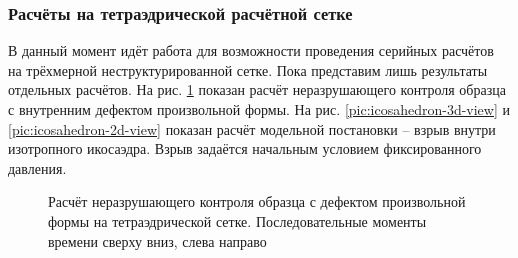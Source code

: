 \subsubsection{Расчёты на тетраэдрической расчётной сетке}
В данный момент идёт работа для возможности проведения серийных расчётов на трёхмерной неструктурированной сетке. Пока представим лишь результаты отдельных расчётов. На рис. \ref{pic:layers-tetr} показан расчёт неразрушающего контроля образца с внутренним дефектом произвольной формы. На рис. \ref{pic:icosahedron-3d-view} и \ref{pic:icosahedron-2d-view} показан расчёт модельной постановки -- взрыв внутри изотропного икосаэдра. Взрыв задаётся начальным условием фиксированного давления.
\begin{figure}%
	\caption{Расчёт неразрушающего контроля образца с дефектом произвольной формы на тетраэдрической сетке. Последовательные моменты времени сверху вниз, слева направо}
	\label{pic:layers-tetr}
\end{figure}

